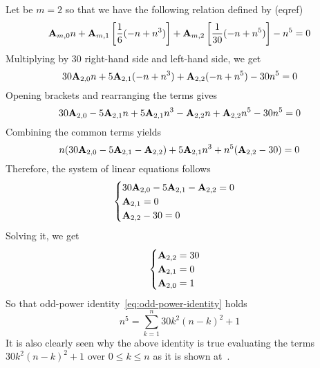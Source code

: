 \begin{examp}
    Let be $m=2$ so that we have the following relation defined by (eqref)
    \begin{equation*}
        {\mathbf{A}} \sb{m,0} n
        + {\mathbf{A}} \sb{m,1} \left[ \frac{1}{6} (-n + n^3) \right]
        + {\mathbf{A}} \sb{m,2} \left[ \frac{1}{30} (-n + n^5) \right] - n^5 = 0
    \end{equation*}
    Multiplying by $30$ right-hand side and left-hand side, we get
    \begin{equation*}
        30 {\mathbf{A}} \sb{2,0} n + 5 {\mathbf{A}} \sb{2,1} (-n + n^3) + {\mathbf{A}} \sb{2,2} (-n + n^5) - 30n^5 = 0
    \end{equation*}
    Opening brackets and rearranging the terms gives
    \begin{equation*}
        30 {\mathbf{A}} \sb{2,0} - 5 {\mathbf{A}} \sb{2,1} n + 5 {\mathbf{A}} \sb{2,1} n^3 - {\mathbf{A}} \sb{2,2} n + {\mathbf{A}} \sb{2,2} n^5 - 30n^5 = 0
    \end{equation*}
    Combining the common terms yields
    \begin{equation*}
        n (30 {\mathbf{A}} \sb{2,0} - 5 {\mathbf{A}} \sb{2,1} - {\mathbf{A}} \sb{2,2}) + 5 {\mathbf{A}} \sb{2,1} n^3 + n^5 ({\mathbf{A}} \sb{2,2} - 30) = 0
    \end{equation*}
    Therefore, the system of linear equations follows
    \begin{equation*}
        \begin{cases}
            30 {\mathbf{A}} \sb{2,0} - 5 {\mathbf{A}} \sb{2,1} - {\mathbf{A}} \sb{2,2} = 0 \\
            {\mathbf{A}} \sb{2,1} = 0 \\
            {\mathbf{A}} \sb{2,2} - 30 = 0
        \end{cases}
    \end{equation*}
    Solving it, we get
    \begin{equation*}
        \begin{cases}
            {\mathbf{A}} \sb{2,2} = 30 \\
            {\mathbf{A}} \sb{2,1} = 0 \\
            {\mathbf{A}} \sb{2,0} = 1
        \end{cases}
    \end{equation*}
    So that odd-power identity~\eqref{eq:odd-power-identity} holds
    \begin{equation*}
        n^5 = \sum_{k=1}^{n} 30k^2(n-k)^2 + 1
    \end{equation*}
    It is also clearly seen
    why the above identity is true evaluating the terms $30k^2(n-k)^2 + 1$ over $0 \leq k \leq n$ as
    it is shown at~\cite{kolosov2018fifth}.
\end{examp}
